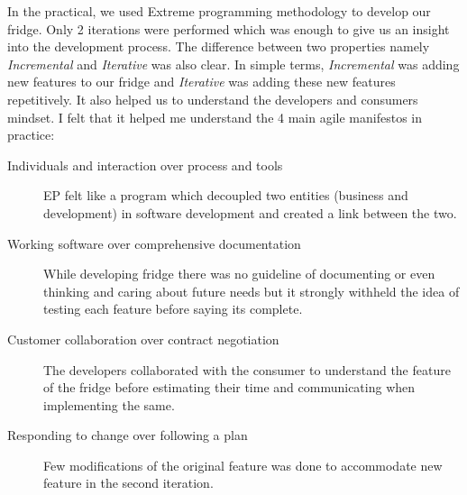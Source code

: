 \documentclass[12pt]{article}
\begin{document}
In the practical, we used Extreme programming methodology to develop our fridge. Only 2 iterations were performed which was enough to give us an insight into the development process. The difference between two properties namely \textit{Incremental} and \textit{Iterative} was also clear. In simple terms, \textit{Incremental} was adding new features to our fridge and \textit{Iterative} was adding these new features repetitively. It also helped us to understand the developers and consumers mindset. I felt that it helped me understand the 4 main agile manifestos in practice:
\begin{description}
    \item [Individuals and interaction over process and tools] EP felt like a program which decoupled two entities (business and development) in software development and created a link between the two.
    \item [Working software over comprehensive documentation] While developing fridge there was no guideline of documenting or even thinking and caring about future needs but it strongly withheld the idea of testing each feature before saying its complete.
    \item [Customer collaboration over contract negotiation] The developers collaborated with the consumer to understand the feature of the fridge before estimating their time and communicating when implementing the same.
    \item [Responding to change over following a plan] Few modifications of the original feature was done to accommodate new feature in the second iteration.
\end{description}
\end{document}

